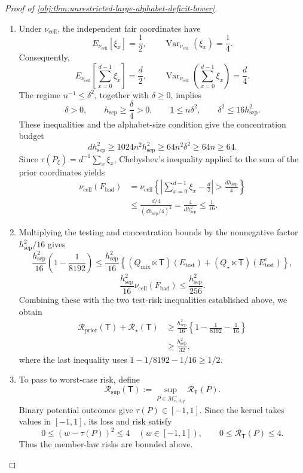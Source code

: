 \begin{proof}[Proof of \cref{obj:thm:unrestricted-large-alphabet-deficit-lower}]
\begin{enumerate}
\item Under \(\nu_{\mathrm{cell}}\), the independent fair coordinates have
\[
E_{\nu_{\mathrm{cell}}}[\xi_x]=\frac12,
\qquad
\operatorname{Var}_{\nu_{\mathrm{cell}}}(\xi_x)=\frac14.
\]
Consequently,
\[
E_{\nu_{\mathrm{cell}}}\!\left[\sum_{x=0}^{d-1}\xi_x\right]
=\frac d2,
\qquad
\operatorname{Var}_{\nu_{\mathrm{cell}}}
\!\left(\sum_{x=0}^{d-1}\xi_x\right)
=\frac d4.
\]
The regime \(n^{-1}\le\delta^2\), together with \(\delta\ge0\), implies
\[
\delta>0,\qquad h_{\mathrm{sep}}\ge\frac{\delta}{4}>0,
\qquad
1\le n\delta^2,\qquad
\delta^2\le16h_{\mathrm{sep}}^2.
\]
These inequalities and the alphabet-size condition give the concentration budget
\[
d h_{\mathrm{sep}}^2
\ge1024n^2h_{\mathrm{sep}}^2
\ge64n^2\delta^2
\ge64n
\ge64.
\]
Since \(\tau(P_\xi)=d^{-1}\sum_x\xi_x\), Chebyshev's inequality applied to the sum of the prior coordinates yields
\[
\begin{aligned}
\nu_{\mathrm{cell}}(F_{\mathrm{bad}})
&=
\nu_{\mathrm{cell}}
\left\{
\left|\sum_{x=0}^{d-1}\xi_x-\frac d2\right|
>\frac{d h_{\mathrm{sep}}}{4}
\right\}
\\
&\le
\frac{d/4}{(d h_{\mathrm{sep}}/4)^2}
=
\frac4{d h_{\mathrm{sep}}^2}
\le\frac1{16}.
\end{aligned}
\]

\item Multiplying the testing and concentration bounds by the nonnegative factor \(h_{\mathrm{sep}}^2/16\) gives
\[
\frac{h_{\mathrm{sep}}^2}{16}
\left(1-\frac1{8192}\right)
\le
\frac{h_{\mathrm{sep}}^2}{16}
\left\{
(Q_{\mathrm{mix}}\ltimes\mathsf T)(E_{\mathrm{test}})
+
(Q_\star\ltimes\mathsf T)(E_{\mathrm{test}}^c)
\right\},
\]
\[
\frac{h_{\mathrm{sep}}^2}{16}
\nu_{\mathrm{cell}}(F_{\mathrm{bad}})
\le\frac{h_{\mathrm{sep}}^2}{256}.
\]
Combining these with the two test-risk inequalities established above, we obtain
\[
\begin{aligned}
\mathcal R_{\mathrm{prior}}(\mathsf T)
+\mathcal R_\star(\mathsf T)
&\ge
\frac{h_{\mathrm{sep}}^2}{16}
\left\{
1-\frac1{8192}-\frac1{16}
\right\}
\\
&\ge\frac{h_{\mathrm{sep}}^2}{32},
\end{aligned}
\]
where the last inequality uses
\(1-1/8192-1/16\ge1/2\). %

\item To pass to worst-case risk, define
\[
\mathcal R_{\mathrm{sup}}(\mathsf T)
:=
\sup_{P\in\mathcal M^{+}_{n,d,q}}
\mathcal R_{\mathsf T}(P).
\]
Binary potential outcomes give \(\tau(P)\in[-1,1]\). Since the kernel takes values in \([-1,1]\), its loss and risk satisfy
\[
0\le(w-\tau(P))^2\le4
\quad(w\in[-1,1]),
\qquad
0\le\mathcal R_{\mathsf T}(P)\le4.
\]
Thus the member-law risks are bounded above.


\end{enumerate}
\end{proof}
